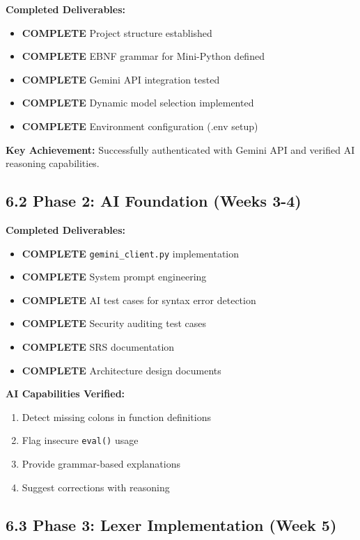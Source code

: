\documentclass[a4paper,11pt]{article}
\newcommand{\statusgood}[1]{\colorbox{green!20}{\textbf{#1}}}
\begin{document}
\textbf{Completed Deliverables:}
\begin{itemize}[leftmargin=*]
    \item \statusgood{COMPLETE} Project structure established
    \item \statusgood{COMPLETE} EBNF grammar for Mini-Python defined
    \item \statusgood{COMPLETE} Gemini API integration tested
    \item \statusgood{COMPLETE} Dynamic model selection implemented
    \item \statusgood{COMPLETE} Environment configuration (.env setup)
\end{itemize}

\textbf{Key Achievement:} Successfully authenticated with Gemini API and verified AI reasoning capabilities.

\subsection{6.2 Phase 2: AI Foundation (Weeks 3-4)}

\textbf{Completed Deliverables:}
\begin{itemize}[leftmargin=*]
    \item \statusgood{COMPLETE} \texttt{gemini\_client.py} implementation
    \item \statusgood{COMPLETE} System prompt engineering
    \item \statusgood{COMPLETE} AI test cases for syntax error detection
    \item \statusgood{COMPLETE} Security auditing test cases
    \item \statusgood{COMPLETE} SRS documentation
    \item \statusgood{COMPLETE} Architecture design documents
\end{itemize}

\textbf{AI Capabilities Verified:}
\begin{enumerate}
    \item Detect missing colons in function definitions
    \item Flag insecure \texttt{eval()} usage
    \item Provide grammar-based explanations
    \item Suggest corrections with reasoning
\end{enumerate}

\subsection{6.3 Phase 3: Lexer Implementation (Week 5)}
\end{document}
